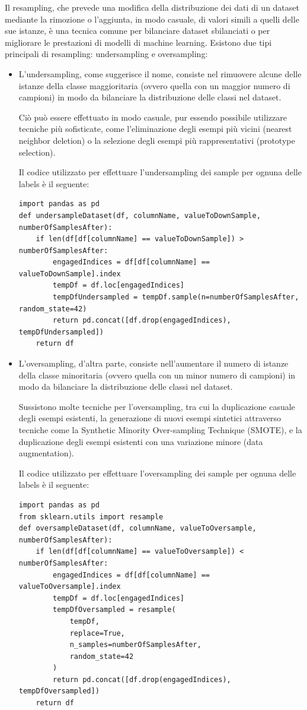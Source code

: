 Il resampling, che prevede una modifica  della distribuzione dei dati di un dataset mediante la rimozione o l’aggiunta, in modo casuale, di valori simili a quelli delle sue istanze, è una tecnica comune per bilanciare dataset sbilanciati o per migliorare le prestazioni di modelli di machine learning. Esistono due tipi principali di resampling: undersampling e oversampling:
\begin{itemize}
    \item L'undersampling, come suggerisce il nome, consiste nel rimuovere alcune delle istanze della classe maggioritaria (ovvero quella con un maggior numero di campioni) in modo da bilanciare la distribuzione delle classi nel dataset. 
    
Ciò può essere effettuato in modo casuale, pur essendo possibile utilizzare tecniche più sofisticate, come l'eliminazione degli esempi più vicini (nearest neighbor deletion) o la selezione degli esempi più rappresentativi (prototype selection). 

Il codice utilizzato per effettuare l’undersampling dei sample per ognuna delle labels è il seguente:
\begin{verbatim}
import pandas as pd
def undersampleDataset(df, columnName, valueToDownSample, numberOfSamplesAfter):
    if len(df[df[columnName] == valueToDownSample]) > numberOfSamplesAfter:
        engagedIndices = df[df[columnName] == valueToDownSample].index
        tempDf = df.loc[engagedIndices]
        tempDfUndersampled = tempDf.sample(n=numberOfSamplesAfter, random_state=42)
        return pd.concat([df.drop(engagedIndices), tempDfUndersampled])
    return df
\end{verbatim}
\item L'oversampling, d'altra parte, consiste nell'aumentare il numero di istanze della classe minoritaria (ovvero quella con un minor numero di campioni) in modo da bilanciare la distribuzione delle classi nel dataset.

Sussistono molte tecniche per l'oversampling, tra cui la duplicazione casuale degli esempi esistenti, la generazione di nuovi esempi sintetici attraverso tecniche come la Synthetic Minority Over-sampling Technique (SMOTE), e la duplicazione degli esempi esistenti con una variazione minore (data augmentation). 

Il codice utilizzato per effettuare l’oversampling dei sample per ognuna delle labels è il seguente:
\begin{verbatim}
import pandas as pd
from sklearn.utils import resample
def oversampleDataset(df, columnName, valueToOversample, numberOfSamplesAfter):
    if len(df[df[columnName] == valueToOversample]) < numberOfSamplesAfter:
        engagedIndices = df[df[columnName] == valueToOversample].index
        tempDf = df.loc[engagedIndices]
        tempDfOversampled = resample(
            tempDf, 
            replace=True, 
            n_samples=numberOfSamplesAfter, 
            random_state=42
        )
        return pd.concat([df.drop(engagedIndices), tempDfOversampled])
    return df
\end{verbatim}

\end{itemize}

